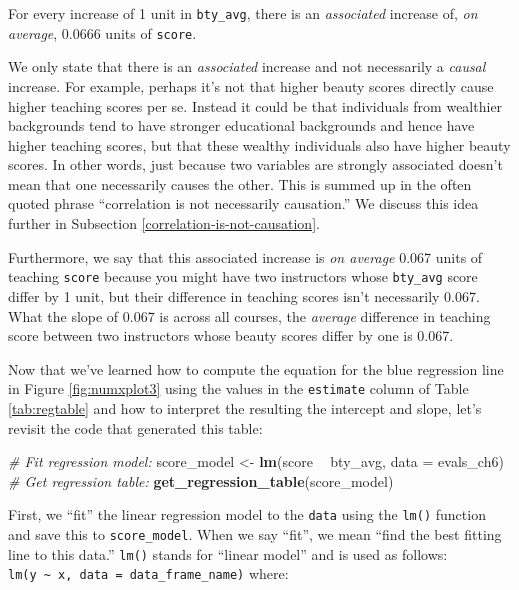 \documentclass[12pt, krantz2,]{krantz}
\makeatletter
\newenvironment{Shaded}{\begin{snugshade}}{\end{snugshade}}
\newcommand{\CommentTok}[1]{\textcolor[rgb]{0.37,0.37,0.37}{\textit{#1}}}
\newcommand{\DataTypeTok}[1]{\textcolor[rgb]{0.27,0.27,0.27}{#1}}
\newcommand{\KeywordTok}[1]{\textcolor[rgb]{0.27,0.27,0.27}{\textbf{#1}}}
\newcommand{\NormalTok}[1]{#1}
\newcommand{\OperatorTok}[1]{\textcolor[rgb]{0.43,0.43,0.43}{\textbf{#1}}}
\newcommand{\StringTok}[1]{\textcolor[rgb]{0.5,0.5,0.5}{#1}}
\renewenvironment{quote}{\begin{VF}}{\end{VF}}
\newenvironment{kframe}{%
\medskip{}
\setlength{\fboxsep}{.8em}
 \def\at@end@of@kframe{}%
 \ifinner\ifhmode%
  \def\at@end@of@kframe{\end{minipage}}%
  \begin{minipage}{\columnwidth}%
 \fi\fi%
 \def\FrameCommand##1{\hskip\@totalleftmargin \hskip-\fboxsep
 \colorbox{shadecolor}{##1}\hskip-\fboxsep
     \hskip-\linewidth \hskip-\@totalleftmargin \hskip\columnwidth}%
 \MakeFramed {\advance\hsize-\width
   \@totalleftmargin\z@ \linewidth\hsize
   \@setminipage}}%
 {\par\unskip\endMakeFramed%
 \at@end@of@kframe}
\renewenvironment{Shaded}{\begin{kframe}}{\end{kframe}}
\makeatother
\begin{document}
\begin{quote}
For every increase of 1 unit in \texttt{bty\_avg}, there is an \emph{associated} increase of, \emph{on average}, 0.0666 units of \texttt{score}.
\end{quote}

We only state that there is an \emph{associated} increase and not necessarily a \emph{causal} increase. For example, perhaps it's not that higher beauty scores directly cause higher teaching scores per se. Instead it could be that individuals from wealthier backgrounds tend to have stronger educational backgrounds and hence have higher teaching scores, but that these wealthy individuals also have higher beauty scores. In other words, just because two variables are strongly associated doesn't mean that one necessarily causes the other. This is summed up in the often quoted phrase ``correlation is not necessarily causation.'' We discuss this idea further in Subsection \ref{correlation-is-not-causation}.

Furthermore, we say that this associated increase is \emph{on average} 0.067 units of teaching \texttt{score} because you might have two instructors whose \texttt{bty\_avg} score differ by 1 unit, but their difference in teaching scores isn't necessarily 0.067. What the slope of 0.067 is across all courses, the \emph{average} difference in teaching score between two instructors whose beauty scores differ by one is 0.067.

Now that we've learned how to compute the equation for the blue regression line in Figure \ref{fig:numxplot3} using the values in the \texttt{estimate} column of Table \ref{tab:regtable} and how to interpret the resulting the intercept and slope, let's revisit the code that generated this table:

\begin{Shaded}
\begin{Highlighting}[]
\CommentTok{# Fit regression model:}
\NormalTok{score_model <-}\StringTok{ }\KeywordTok{lm}\NormalTok{(score }\OperatorTok{~}\StringTok{ }\NormalTok{bty_avg, }\DataTypeTok{data =}\NormalTok{ evals_ch6)}
\CommentTok{# Get regression table:}
\KeywordTok{get_regression_table}\NormalTok{(score_model)}
\end{Highlighting}
\end{Shaded}

First, we ``fit'' the linear regression model to the \texttt{data} using the \texttt{lm()} function and save this to \texttt{score\_model}. When we say ``fit'', we mean ``find the best fitting line to this data.'' \texttt{lm()} stands for ``linear model'' and is used as follows: \texttt{lm(y\ \textasciitilde{}\ x,\ data\ =\ data\_frame\_name)} where:
\end{document}
